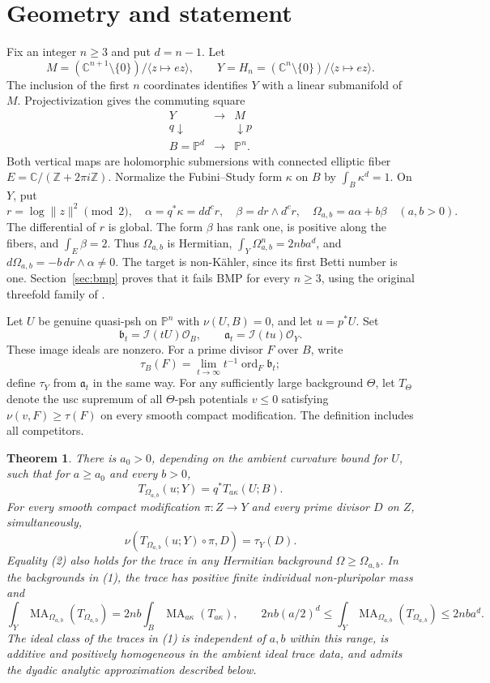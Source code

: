 \documentclass[11pt]{article}
\newcommand{\ddc}{dd^c}
\newcommand{\MA}{\operatorname{MA}}
\newcommand{\ord}{\operatorname{ord}}
\newcommand{\PP}{\mathbb P}
\newcommand{\I}{\mathcal I}
\newcommand{\cO}{\mathcal O}
\newtheorem{theorem}{Theorem}
\theoremstyle{remark}\newtheorem{remark}[theorem]{Remark}
\begin{document}
\section{Geometry and statement}
Fix an integer $n\ge3$ and put $d=n-1$. Let
\[
 M=(\mathbb C^{n+1}\setminus\{0\})/\langle z\mapsto ez\rangle,
 \qquad
 Y=H_n=(\mathbb C^n\setminus\{0\})/\langle z\mapsto ez\rangle.
\]
The inclusion of the first $n$ coordinates identifies $Y$ with a
linear submanifold of $M$. Projectivization gives the commuting square
\[
 \begin{matrix}Y&\longrightarrow&M\\
 q\downarrow&&\downarrow p\\
 B=\PP^d&\longrightarrow&\PP^n.
 \end{matrix}
\]
Both vertical maps are holomorphic submersions with connected elliptic
fiber $E=\mathbb C/(\mathbb Z+2\pi i\mathbb Z)$.
Normalize the Fubini--Study form $\kappa$ on $B$ by
$\int_B\kappa^d=1$. On $Y$, put
\[
 r=\log\|z\|^2\pmod 2,
 \quad \alpha=q^*\kappa=\ddc r,
 \quad \beta=dr\wedge d^cr,
 \quad \Omega_{a,b}=a\alpha+b\beta \quad(a,b>0).
\]
The differential of $r$ is global. The form $\beta$ has rank one,
is positive along the fibers, and $\int_E\beta=2$.
Thus $\Omega_{a,b}$ is Hermitian, $\int_Y\Omega_{a,b}^n=2nba^d$,
and $d\Omega_{a,b}=-b\,dr\wedge\alpha\ne0$.
The target is non-K\"ahler, since its first Betti number is one.
Section~\ref{sec:bmp} proves that it fails BMP for every $n\ge3$,
using the original threefold family of \cite{XZ}.

Let $U$ be genuine quasi-psh on $\PP^n$ with $\nu(U,B)=0$,
and let $u=p^*U$. Set
\[
 \mathfrak b_t=\I(tU)\cO_B,
 \qquad \mathfrak a_t=\I(tu)\cO_Y.
\]
These image ideals are nonzero. For a prime divisor $F$ over $B$,
write
\[
 \tau_B(F)=\lim_{t\to\infty}t^{-1}\ord_F\mathfrak b_t;
\]
define $\tau_Y$ from $\mathfrak a_t$ in the same way.
For any sufficiently large background $\Theta$, let
$T_\Theta$ denote the usc supremum of all $\Theta$-psh potentials
$v\le0$ satisfying $\nu(v,F)\ge\tau(F)$ on every smooth compact
modification. The definition includes all competitors.

\begin{theorem}\label{thm:main}
There is $a_0>0$, depending on the ambient curvature bound for $U$,
such that for $a\ge a_0$ and every $b>0$,
\[
 T_{\Omega_{a,b}}(u;Y)=q^*T_{a\kappa}(U;B).
 \tag{1}
\]
For every smooth compact modification $\pi:Z\to Y$ and every prime
divisor $D$ on $Z$, simultaneously,
\[
 \nu(T_{\Omega_{a,b}}(u;Y)\circ\pi,D)=\tau_Y(D).
 \tag{2}
\]
Equality (2) also holds for the trace in any Hermitian background
$\Omega\ge\Omega_{a,b}$. In the backgrounds in (1), the trace has
positive finite individual non-pluripolar mass and
\[
 \int_Y\MA_{\Omega_{a,b}}(T_{\Omega_{a,b}})
   =2nb\int_B\MA_{a\kappa}(T_{a\kappa}),
 \qquad
 2nb(a/2)^d\le\int_Y\MA_{\Omega_{a,b}}(T_{\Omega_{a,b}})
   \le2nba^d.
 \tag{3}
\]
The ideal class of the traces in (1) is independent of $a,b$ within
this range, is additive and positively homogeneous in the ambient
ideal trace data, and admits the dyadic analytic approximation
described below.
\end{theorem}
\end{document}
